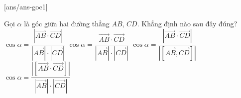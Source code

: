 [ans/ans-goc1]
\TN
\begin{ex}%
	Gọi $\alpha $ là góc giữa hai đường thẳng $AB$, $CD$. Khẳng định nào sau đây đúng?
	\choice
	{\True $\cos\alpha=\dfrac{\left|\overrightarrow{AB}\cdot\overrightarrow{CD}\right|}{\left|\overrightarrow{AB}\right|\cdot \left|\overrightarrow{CD}\right|}$}
	{$\cos\alpha=\dfrac{\overrightarrow{AB}\cdot\overrightarrow{CD}}{\left|\overrightarrow{AB}\right|\cdot \left|\overrightarrow{CD}\right|}$}
	{$\cos\alpha=\dfrac{\left|\overrightarrow{AB}\cdot\overrightarrow{CD}\right|}{\left|\left[\overrightarrow{AB},\overrightarrow{CD}\right]\right|}$}
	{$\cos\alpha=\dfrac{\left|\left[\overrightarrow{AB}\cdot \overrightarrow{CD}\right]\right|}{\left|\overrightarrow{AB}\right|\cdot \left|\overrightarrow{CD}\right|} $}
	
\end{ex}

